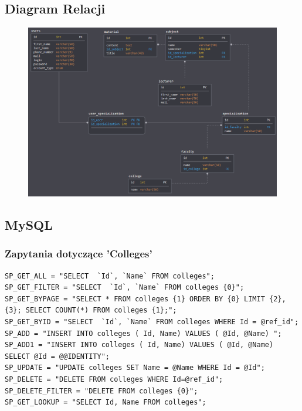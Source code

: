 \documentclass[12pt,a4paper]{article}
\begin{document}
		\subsection{Diagram Relacji}
			\begin{figure}[H]
				\centering
				\includegraphics[width=1\linewidth]{relation_model}
			\end{figure}
		\subsection{MySQL}
			\subsubsection{Zapytania dotyczące 'Colleges'}
			\begin{lstlisting}
SP_GET_ALL = "SELECT  `Id`, `Name` FROM colleges";
SP_GET_FILTER = "SELECT  `Id`, `Name` FROM colleges {0}";
SP_GET_BYPAGE = "SELECT * FROM colleges {1} ORDER BY {0} LIMIT {2}, {3}; SELECT COUNT(*) FROM colleges {1};";
SP_GET_BYID = "SELECT  `Id`, `Name` FROM colleges WHERE Id = @ref_id";
SP_ADD = "INSERT INTO colleges ( Id, Name) VALUES ( @Id, @Name) ";
SP_ADD1 = "INSERT INTO colleges ( Id, Name) VALUES ( @Id, @Name) SELECT @Id = @@IDENTITY";
SP_UPDATE = "UPDATE colleges SET Name = @Name WHERE Id = @Id";
SP_DELETE = "DELETE FROM colleges WHERE Id=@ref_id";
SP_DELETE_FILTER = "DELETE FROM colleges {0}";
SP_GET_LOOKUP = "SELECT Id, Name FROM colleges";			
			\end{lstlisting}
\end{document}
